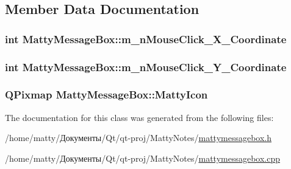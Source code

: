 \subsection{Member Data Documentation}
\subsubsection[{\texorpdfstring{m\+\_\+n\+Mouse\+Click\+\_\+\+X\+\_\+\+Coordinate}{m_nMouseClick_X_Coordinate}}]{\setlength{\rightskip}{0pt plus 5cm}int Matty\+Message\+Box\+::m\+\_\+n\+Mouse\+Click\+\_\+\+X\+\_\+\+Coordinate\hspace{0.3cm}{\ttfamily [private]}}\hypertarget{class_matty_message_box_ad3676e7eb43e10f71b8e48855f55bcc8}{}\label{class_matty_message_box_ad3676e7eb43e10f71b8e48855f55bcc8}
\subsubsection[{\texorpdfstring{m\+\_\+n\+Mouse\+Click\+\_\+\+Y\+\_\+\+Coordinate}{m_nMouseClick_Y_Coordinate}}]{\setlength{\rightskip}{0pt plus 5cm}int Matty\+Message\+Box\+::m\+\_\+n\+Mouse\+Click\+\_\+\+Y\+\_\+\+Coordinate\hspace{0.3cm}{\ttfamily [private]}}\hypertarget{class_matty_message_box_abe066f7b4122bd9dcb602661ec318302}{}\label{class_matty_message_box_abe066f7b4122bd9dcb602661ec318302}
\subsubsection[{\texorpdfstring{Matty\+Icon}{MattyIcon}}]{\setlength{\rightskip}{0pt plus 5cm}Q\+Pixmap Matty\+Message\+Box\+::\+Matty\+Icon\hspace{0.3cm}{\ttfamily [private]}}\hypertarget{class_matty_message_box_acd535bd7bec5cf024ea72146a0cbc4b6}{}\label{class_matty_message_box_acd535bd7bec5cf024ea72146a0cbc4b6}


The documentation for this class was generated from the following files\+:\begin{DoxyCompactItemize}
\item 
/home/matty/Документы/\+Qt/qt-\/proj/\+Matty\+Notes/\hyperlink{mattymessagebox_8h}{mattymessagebox.\+h}\item 
/home/matty/Документы/\+Qt/qt-\/proj/\+Matty\+Notes/\hyperlink{mattymessagebox_8cpp}{mattymessagebox.\+cpp}\end{DoxyCompactItemize}
